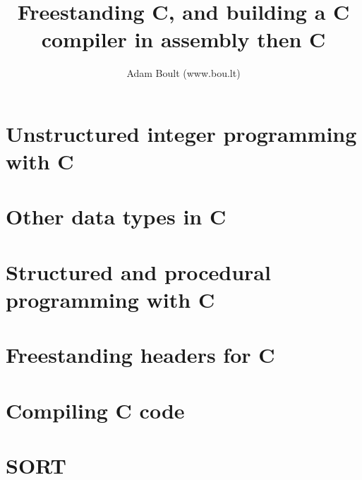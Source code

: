 \documentclass[oneside]{book}
\begin{document}
\author{Adam Boult (www.bou.lt)}
\title{Freestanding C, and building a C compiler in assembly then C}
\maketitle

\setcounter{tocdepth}{0}
\tableofcontents



\part{Unstructured integer programming with C}











\part{Other data types in C}






\part{Structured and procedural programming with C}








\part{Freestanding headers for C}











\part{Compiling C code}




\part{SORT}

\end{document}
